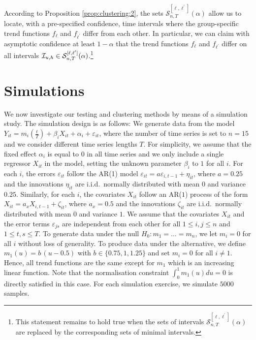 \documentclass[12pt]{article}
\begin{document}
According to Proposition \ref{prop:clustering:2}, the sets $\mathcal{S}^{[\ell,\ell^\prime]}_{n, T}(\alpha)$ allow us to locate, with a pre-specified confidence, time intervals where the group-specific trend functions $f_\ell$ and $f_{\ell^\prime}$ differ from each other. In particular, we can claim with asymptotic confidence at least $1 - \alpha$ that the trend functions $f_\ell$ and $f_{\ell^\prime}$ differ on all intervals $\mathcal{I}_{u, h} \in \mathcal{S}^{[\ell,\ell^\prime]}_{n, T}(\alpha)$.\footnote{This statement remains to hold true when the sets of intervals $\mathcal{S}^{[\ell,\ell^\prime]}_{n, T}(\alpha)$ are replaced by the corresponding sets of minimal intervals.} 



\section{Simulations}\label{sec:sim}


We now investigate our testing and clustering methods by means of a simulation study. The simulation design is as follows: We generate data from the model $Y_{it} = m_i(\frac{t}{T}) + \beta_i X_{it} +  \alpha_i  + \varepsilon_{it}$, where the number of time series is set to $n = 15$ and we consider different time series lengths $T$. For simplicity, we assume that the fixed effect $\alpha_i$ is equal to $0$ in all time series and we only include a single regressor $X_{it}$ in the model, setting the unknown parameter $\beta_i$ to $1$ for all $i$. 
For each $i$, the errors $\varepsilon_{it}$ follow the AR(1) model $\varepsilon_{it} = a \varepsilon_{i, t-1} + \eta_{it}$, where $a = 0.25$ and the innovations $\eta_{it}$ are i.i.d.\ normally distributed with mean $0$ and variance $0.25$. Similarly, for each $i$, the covariates $X_{it}$ follow an AR($1$) process of the form $X_{it} = a_x X_{i, t-1} + \zeta_{it}$, where $a_x = 0.5$ and the innovations $\zeta_{it}$ are i.i.d.\ normally distributed with mean $0$ and variance $1$. We assume that the covariates $X_{it}$ and the error terms $\varepsilon_{js}$ are independent from each other for all $1 \leq i,j \leq n$ and $1 \leq t, s \leq T$. 
To generate data under the null $H_0: m_1 = \ldots = m_n$, we let $m_i = 0$ for all $i$ without loss of generality. To produce data under the alternative, we define $m_1(u) = b \, (u - 0.5) $ with $b \in \{ 0.75, 1, 1.25 \}$ and set $m_i = 0$ for all $i \ne 1$. Hence, all trend functions are the same except for $m_1$ which is an increasing linear function. Note that the normalisation constraint $\int_0^1 m_1(u) du = 0$ is directly satisfied in this case. For each simulation exercise, we simulate $5000$ samples. 
\end{document}

